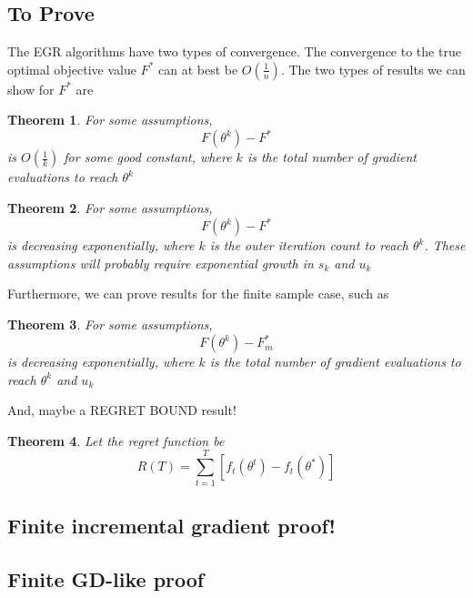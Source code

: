\documentclass[11pt]{article}
\newtheorem{thm}{Theorem}
\begin{document}
\subsection{To Prove}

The EGR algorithms have two types of convergence. The convergence to the true optimal objective value $F^*$ can at best be $O(\frac{1}{n})$. The two types of results we can show for $F^*$ are

\begin{thm}
	\label{thm:our}
	For some assumptions, 
	\begin{equation}
		F(\theta^{k}) - F^*
	\end{equation}
	is $O(\frac{1}{k})$ for some good constant, where $k$ is the total number of gradient evaluations to reach $\theta^{k}$
\end{thm}

\begin{thm}
	\label{thm:our}
	For some assumptions, 
	\begin{equation}
		F(\theta^{k}) - F^*
	\end{equation}
	is decreasing exponentially, where $k$ is the outer iteration count to reach $\theta^{k}$. These assumptions will probably require exponential growth in $s_k$ and $u_k$
\end{thm}

Furthermore, we can prove results for the finite sample case, such as
\begin{thm}
	\label{thm:our}
	For some assumptions, 
	\begin{equation}
		F(\theta^{k}) - F^*_m
	\end{equation}
	is decreasing exponentially, where $k$ is the total number of gradient evaluations to reach $\theta^{k}$ and $u_k$
\end{thm}

And, maybe a REGRET BOUND result!
\begin{thm}
	Let the regret function be 
	\begin{equation}
		R(T) = \sum_{t=1}^{T} \left[ f_t(\theta^t) - f_t(\theta^*)\right]
	\end{equation}
\end{thm}

\subsection{Finite incremental gradient proof!}


\subsection{Finite GD-like proof}
\end{document}
